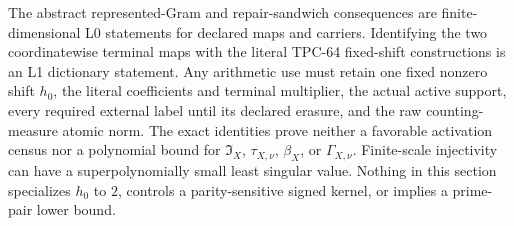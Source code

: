 \begin{remark}
\label{rem:tpc65-repair-claim-boundary}
The abstract represented-Gram and repair-sandwich consequences are
finite-dimensional L0 statements for declared maps and carriers. Identifying
the two coordinatewise terminal maps with the literal TPC-64 fixed-shift
constructions is an L1 dictionary statement. Any arithmetic use
must retain one fixed nonzero shift \(h_0\), the literal coefficients and
terminal multiplier, the actual active support, every required external
label until its declared erasure, and the raw counting-measure atomic
norm.  The exact identities prove neither a favorable activation census
nor a polynomial bound for \(\mathfrak I_X\), \(\tau_{X,\nu}\),
\(\beta_X\), or \(\Gamma_{X,\nu}\).  Finite-scale injectivity can have a
superpolynomially small least singular value.  Nothing in this section
specializes \(h_0\) to \(2\), controls a parity-sensitive signed kernel,
or implies a prime-pair lower bound.
\end{remark}
